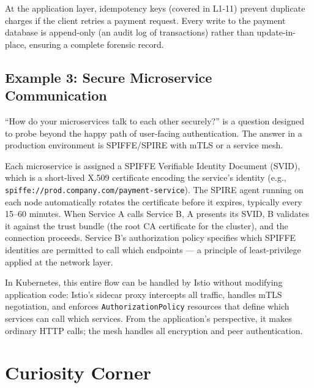 \documentclass[11pt,a4paper]{article}
\begin{document}
At the application layer, idempotency keys (covered in L1-11) prevent duplicate charges if the client retries a payment request. Every write to the payment database is append-only (an audit log of transactions) rather than update-in-place, ensuring a complete forensic record.

\subsection{Example 3: Secure Microservice Communication}

``How do your microservices talk to each other securely?'' is a question designed to probe beyond the happy path of user-facing authentication. The answer in a production environment is SPIFFE/SPIRE with mTLS or a service mesh.

Each microservice is assigned a SPIFFE Verifiable Identity Document (SVID), which is a short-lived X.509 certificate encoding the service's identity (e.g., \texttt{spiffe://prod.company.com/\allowbreak{}payment-service}). The SPIRE agent running on each node automatically rotates the certificate before it expires, typically every 15--60 minutes. When Service A calls Service B, A presents its SVID, B validates it against the trust bundle (the root CA certificate for the cluster), and the connection proceeds. Service B's authorization policy specifies which SPIFFE identities are permitted to call which endpoints --- a principle of least-privilege applied at the network layer.

In Kubernetes, this entire flow can be handled by Istio without modifying application code: Istio's sidecar proxy intercepts all traffic, handles mTLS negotiation, and enforces \texttt{AuthorizationPolicy} resources that define which services can call which services. From the application's perspective, it makes ordinary HTTP calls; the mesh handles all encryption and peer authentication.

\section{Curiosity Corner}
\end{document}
